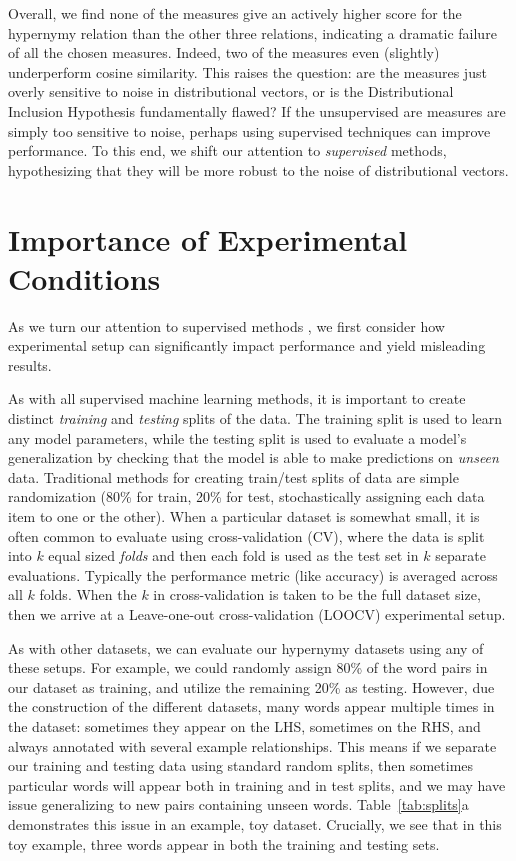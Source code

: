 Overall, we find none of the measures give an actively higher score for the
hypernymy relation than the other three relations, indicating a dramatic
failure of all the chosen measures. Indeed, two of the measures even (slightly)
underperform cosine similarity. This raises the question: are the measures
just overly sensitive to noise in distributional vectors, or is the
Distributional Inclusion Hypothesis fundamentally flawed? If the unsupervised
are measures are simply too sensitive to noise, perhaps using supervised
techniques can improve performance. To this end, we shift our attention to
{\em supervised} methods, hypothesizing that they will be more robust to
the noise of distributional vectors.

\section{Importance of Experimental Conditions}

As we turn our attention to supervised methods , we first consider how
experimental setup can significantly impact performance and yield misleading
results.

As with all supervised machine learning methods, it is important to create
distinct {\em training} and {\em testing} splits of the data. The training
split is used to learn any model parameters, while the testing split is used to
evaluate a model's generalization by checking that the model is able to make
predictions on {\em unseen} data. Traditional methods for creating train/test
splits of data are simple randomization (80\% for train, 20\% for test,
stochastically assigning each data item to one or the other). When a particular
dataset is somewhat small, it is often common to evaluate using
cross-validation (CV), where the data is split into $k$ equal sized {\em folds}
and then each fold is used as the test set in $k$ separate evaluations.
Typically the performance metric (like accuracy) is averaged across all $k$
folds.  When the $k$ in cross-validation is taken to be the full dataset size,
then we arrive at a Leave-one-out cross-validation (LOOCV) experimental setup.

As with other datasets, we can evaluate our hypernymy datasets using any of
these setups. For example, we could randomly assign 80\% of the word pairs in
our dataset as training, and utilize the remaining 20\% as testing. However, due the
construction of the different datasets, many words appear multiple times in the
dataset: sometimes they appear on the LHS, sometimes on the RHS, and always
annotated with several example relationships. This means if we
separate our training and testing data using standard random splits, then
sometimes particular words will appear both in training and in test splits, and
we may have issue generalizing to new pairs containing unseen words.
Table~\ref{tab:splits}a demonstrates this issue in an example, toy dataset.
Crucially, we see that in this toy example, three words appear in both the
training and testing sets.

